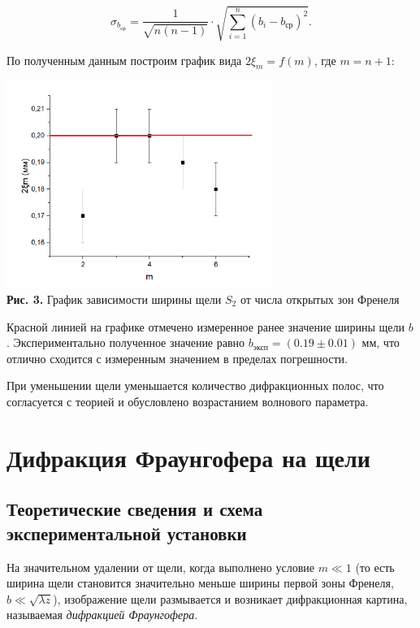 \documentclass[a4paper,12pt]{article} %
\begin{document}
$$
\sigma_{b_{\text{ср}}} = \frac {1} {\sqrt{ n (n-1) }} \cdot \sqrt {\sum_{i=1}^{n} (b_{i} - b_{\text{ср}})^2}.
$$

\hfill \break По полученным данным построим график вида $2\xi_{m} = f(m)$, где $m = n + 1$:

\begin{center}
\includegraphics[width=0.65\textwidth]{4.3.1_3.png}\\
\textbf{Рис. 3.} График зависимости ширины щели $S_2$ от числа открытых зон Френеля \\
\end{center}

\hfill \break Красной линией на графике отмечено измеренное ранее значение ширины щели $b$. Экспериментально полученное значение равно $b_{\text{эксп}} = (0.19 \pm 0.01)$ мм, что отлично сходится с измеренным значением в пределах погрешности.

\hfill \break При уменьшении щели уменьшается количество дифракционных полос, что согласуется с теорией и обусловлено возрастанием волнового параметра. 

\section{Дифракция Фраунгофера на щели}
\subsection{Теоретические сведения и схема экспериментальной установки}

\hfill \break На значительном удалении от щели, когда выполнено условие $m \ll 1$ (то есть ширина щели становится значительно меньше ширины первой зоны Френеля, $b \ll \sqrt{\lambda z}$), изображение щели размывается и возникает дифракционная картина, называемая \textit{дифракцией Фраунгофера}.
\end{document}
